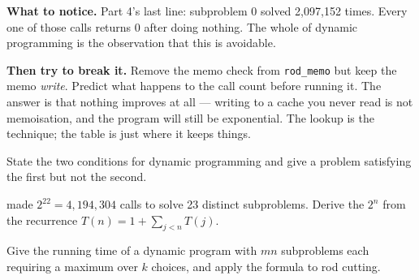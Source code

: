 \begin{lab}
\textbf{What to notice.} Part 4's last line: subproblem 0 solved 2{,}097{,}152
times. Every one of those calls returns 0 after doing nothing. The whole of
dynamic programming is the observation that this is avoidable.

\smallskip
\textbf{Then try to break it.} Remove the memo check from
\texttt{rod\_memo} but keep the memo \emph{write}. Predict what happens to the
call count before running it. The answer is that nothing improves at all ---
writing to a cache you never read is not memoisation, and the program will
still be exponential. The lookup is the technique; the table is just where it
keeps things.
\end{lab}

\begin{checkpoint}
\begin{tightnum}
  \item State the two conditions for dynamic programming and give a problem
        satisfying the first but not the second.
  \item {} made $2^{22} = 4{,}194{,}304$ calls to solve 23
        distinct subproblems. Derive the $2^{n}$ from the recurrence
        $T(n) = 1 + \sum_{j<n} T(j)$.
  \item Give the running time of a dynamic program with $mn$ subproblems each
        requiring a maximum over $k$ choices, and apply the formula to rod
        cutting.
\end{tightnum}
\end{checkpoint}

